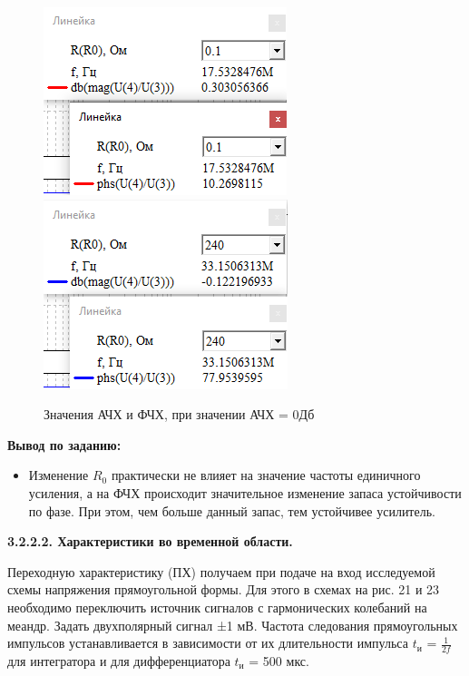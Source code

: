 \documentclass[a4paper,14pt]{extarticle}
\begin{document}
    \begin{figure}[h!]
        \begin{center}
           \includegraphics[scale=0.8]{26.png}
           \includegraphics[scale=0.8]{27.png}           
        \end{center}
        \vspace{-0.7cm}
        \caption{Значения АЧХ и ФЧХ, при значении АЧХ = 0Дб}
        \vspace{-0.5cm}
    \end{figure}   

    \vspace{1.5cm}
    \textbf{Вывод по заданию:}

    \begin{itemize}
        \item  Изменение $R_0$ практически не влияет на значение частоты единичного усиления, а на ФЧХ происходит значительное изменение запаса устойчивости по
фазе. При этом, чем больше данный запас, тем устойчивее усилитель.
    \end{itemize}
 
    \begin{center}
        \textbf{3.2.2.2. Характеристики во временной области.}
    \end{center}

    Переходную характеристику (ПХ) получаем при подаче на вход исследуемой 
    схемы напряжения прямоугольной формы. Для этого в схемах на рис. 21 и 
    23 необходимо переключить источник сигналов с гармонических колебаний 
    на меандр. Задать двухполярный сигнал ±1 мВ. Частота следования 
    прямоугольных импульсов устанавливается в зависимости от их 
    длительности импульса $t_\text{и}$ = $\frac{1}{2f}$ для интегратора и для 
    дифференциатора $t_\text{и}$ = 500 мкс.
\end{document}
